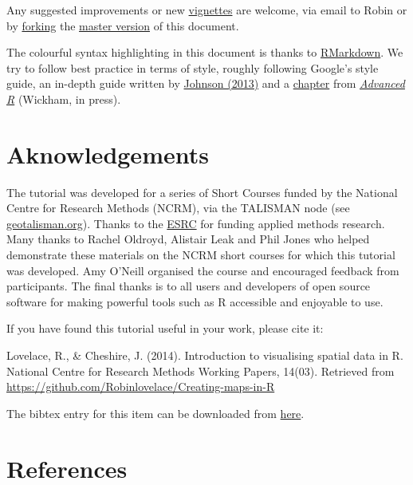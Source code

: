 \documentclass[]{article}
\begin{document}
Any suggested improvements or new
\href{https://github.com/Robinlovelace/Creating-maps-in-R/tree/master/vignettes}{vignettes}
are welcome, via email to Robin or by
\href{https://help.github.com/articles/fork-a-repo}{forking} the
\href{https://github.com/Robinlovelace/Creating-maps-in-R/blob/master/intro-spatial.Rmd}{master
version} of this document.

The colourful syntax highlighting in this document is thanks to
\href{http://rmarkdown.rstudio.com/}{RMarkdown}. We try to follow best
practice in terms of style, roughly following Google's style guide, an
in-depth guide written by
\href{http://cran.r-project.org/web/packages/rockchalk/vignettes/Rstyle.pdf}{Johnson
(2013)} and a \href{http://adv-r.had.co.nz/Style.html}{chapter} from
\href{http://adv-r.had.co.nz/}{\emph{Advanced R}} (Wickham, in press).

\section{Aknowledgements}\label{aknowledgements}

The tutorial was developed for a series of Short Courses funded by the
National Centre for Research Methods (NCRM), via the TALISMAN node (see
\href{http://www.geotalisman.org/}{geotalisman.org}). Thanks to the
\href{http://www.esrc.ac.uk/}{ESRC} for funding applied methods
research. Many thanks to Rachel Oldroyd, Alistair Leak and Phil Jones
who helped demonstrate these materials on the NCRM short courses for
which this tutorial was developed. Amy O'Neill organised the course and
encouraged feedback from participants. The final thanks is to all users
and developers of open source software for making powerful tools such as
R accessible and enjoyable to use.

If you have found this tutorial useful in your work, please cite it:

Lovelace, R., \& Cheshire, J. (2014). Introduction to visualising
spatial data in R. National Centre for Research Methods Working Papers,
14(03). Retrieved from
\url{https://github.com/Robinlovelace/Creating-maps-in-R}

The bibtex entry for this item can be downloaded from
\href{https://raw.githubusercontent.com/Robinlovelace/Creating-maps-in-R/master/citation.bib}{here}.

\clearpage

\section{References}\label{references}
\end{document}
